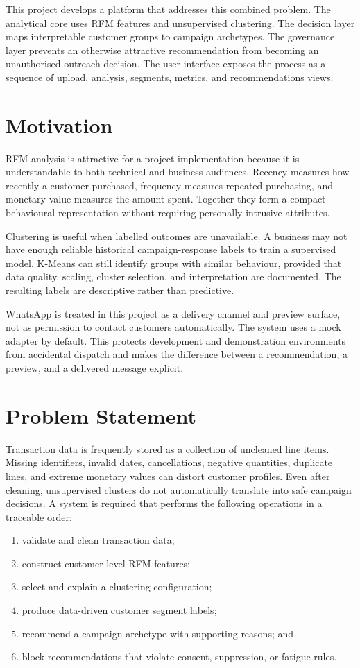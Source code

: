 \documentclass[12pt,a4paper]{report}
\begin{document}
This project develops a platform that addresses this combined problem. The analytical core uses RFM features and unsupervised clustering. The decision layer maps interpretable customer groups to campaign archetypes. The governance layer prevents an otherwise attractive recommendation from becoming an unauthorised outreach decision. The user interface exposes the process as a sequence of upload, analysis, segments, metrics, and recommendations views.

\section{Motivation}
RFM analysis is attractive for a project implementation because it is understandable to both technical and business audiences. Recency measures how recently a customer purchased, frequency measures repeated purchasing, and monetary value measures the amount spent. Together they form a compact behavioural representation without requiring personally intrusive attributes.

Clustering is useful when labelled outcomes are unavailable. A business may not have enough reliable historical campaign-response labels to train a supervised model. K-Means can still identify groups with similar behaviour, provided that data quality, scaling, cluster selection, and interpretation are documented. The resulting labels are descriptive rather than predictive.

WhatsApp is treated in this project as a delivery channel and preview surface, not as permission to contact customers automatically. The system uses a mock adapter by default. This protects development and demonstration environments from accidental dispatch and makes the difference between a recommendation, a preview, and a delivered message explicit.

\section{Problem Statement}
Transaction data is frequently stored as a collection of uncleaned line items. Missing identifiers, invalid dates, cancellations, negative quantities, duplicate lines, and extreme monetary values can distort customer profiles. Even after cleaning, unsupervised clusters do not automatically translate into safe campaign decisions. A system is required that performs the following operations in a traceable order:
\begin{enumerate}
\item validate and clean transaction data;
\item construct customer-level RFM features;
\item select and explain a clustering configuration;
\item produce data-driven customer segment labels;
\item recommend a campaign archetype with supporting reasons; and
\item block recommendations that violate consent, suppression, or fatigue rules.
\end{enumerate}
\end{document}
